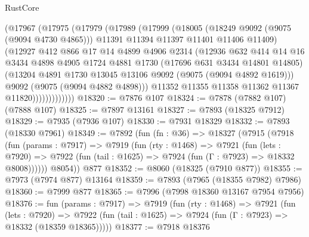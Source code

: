 \begin{lexlean}{RustCore}
\begin{coremodule}
                  (@17967
                    (@17975
                      (@17979
                        (@17989
                          (@17999
                            (@18005
                              (@18249 @9092 (@9075 (@9094 @4730 @4865)))
                              @11391
                              @11394
                              @11397
                              @11401
                              @11406
                              @11409)
                            (@12927
                              @412
                              @866
                              @17
                              @14
                              @4899
                              @4906
                              @2314
                              (@12936
                                @632
                                @414
                                @14
                                @16
                                @3434
                                @4898
                                @4905
                                @1724
                                @4881
                                @1730
                                (@17696 @631 @3434 @14801 @14805)
                                (@13204 @4891 @1730 @13045 @13106 @9092 (@9075 (@9094 @4892 @1619)))
                                @9092
                                (@9075 (@9094 @4882 @4898)))
                              @11352
                              @11355
                              @11358
                              @11362
                              @11367
                              @11820)))))))))))))
@18320 := @7876 @107
@18324 := @7878 (@7882 @107) (@7888 @107)
@18325 := @7897 @13161
@18327 := @7893 (@18325 @7912)
@18329 := @7935 (@7936 @107)
@18330 := @7931 @18329
@18332 := @7893 (@18330 @7961)
@18349 := @7892
    (fun (fn : @36) =>
    @18327
      (@7915
        (@7918
          (fun (params : @7917) =>
          @7919
            (fun (rty : @1468) =>
            @7921
              (fun (lets : @7920) =>
              @7922 (fun (tail : @1625) => @7924 (fun (Γ : @7923) => @18332 @8008))))))
        @8054))
    @877
@18352 := @8060 (@18325 (@7910 @877))
@18355 := @7973 (@7974 @877) @13164
@18359 := @7893 (@7965 (@18355 @7982) @7986)
@18360 := @7999 @877
@18365 := @7996 (@7998 @18360 @13167 @7954 @7956)
@18376 := fun (params : @7917) =>
  @7919
    (fun (rty : @1468) =>
    @7921
      (fun (lets : @7920) =>
      @7922 (fun (tail : @1625) => @7924 (fun (Γ : @7923) => @18332 (@18359 @18365)))))
@18377 := @7918 @18376

\end{coremodule}
\end{lexlean}
